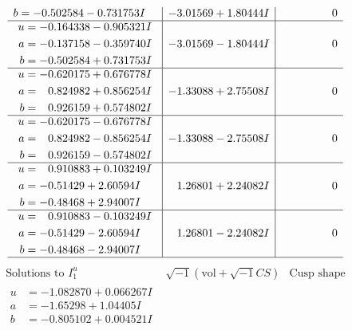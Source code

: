 \documentclass[1p]{elsarticle_modified}
\theoremstyle{definition}
\newcommand{\I}{\sqrt{-1}}
\begin{document}
$$\begin{array}{c|c|c}
\begin{aligned}
b &= -0.502584 - 0.731753 I\end{aligned}
 & -3.01569 + 1.80444 I & \phantom{-0.000000 } 0 \\ \hline\begin{aligned}
u &= -0.164338 - 0.905321 I \\
a &= -0.137158 - 0.359740 I \\
b &= -0.502584 + 0.731753 I\end{aligned}
 & -3.01569 - 1.80444 I & \phantom{-0.000000 } 0 \\ \hline\begin{aligned}
u &= -0.620175 + 0.676778 I \\
a &= \phantom{-}0.824982 + 0.856254 I \\
b &= \phantom{-}0.926159 + 0.574802 I\end{aligned}
 & -1.33088 + 2.75508 I & \phantom{-0.000000 } 0 \\ \hline\begin{aligned}
u &= -0.620175 - 0.676778 I \\
a &= \phantom{-}0.824982 - 0.856254 I \\
b &= \phantom{-}0.926159 - 0.574802 I\end{aligned}
 & -1.33088 - 2.75508 I & \phantom{-0.000000 } 0 \\ \hline\begin{aligned}
u &= \phantom{-}0.910883 + 0.103249 I \\
a &= -0.51429 + 2.60594 I \\
b &= -0.48468 + 2.94007 I\end{aligned}
 & \phantom{-}1.26801 + 2.24082 I & \phantom{-0.000000 } 0 \\ \hline\begin{aligned}
u &= \phantom{-}0.910883 - 0.103249 I \\
a &= -0.51429 - 2.60594 I \\
b &= -0.48468 - 2.94007 I\end{aligned}
 & \phantom{-}1.26801 - 2.24082 I & \phantom{-0.000000 } 0\\
 \hline 
 \end{array}$$\newpage$$\begin{array}{c|c|c}  
\text{Solutions to }I^u_{1}& \I (\text{vol} + \sqrt{-1}CS) & \text{Cusp shape}\\
 \hline 
\begin{aligned}
u &= -1.082870 + 0.066267 I \\
a &= -1.65298 + 1.04405 I \\
b &= -0.805102 + 0.004521 I\end{aligned}

\end{array}$$
\end{document}

